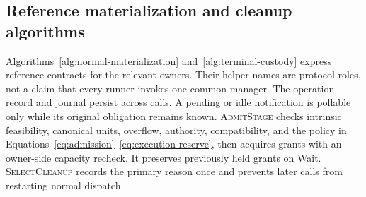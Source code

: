 \subsection{Reference materialization and cleanup algorithms}
\label{sec:algorithms}
Algorithms~\ref{alg:normal-materialization} and~\ref{alg:terminal-custody}
express reference contracts for the relevant owners. Their helper names are
protocol roles, not a claim that every runner invokes one common manager.
The operation record and journal persist across calls. A pending or idle
notification is pollable only while its original obligation remains known.
\textsc{AdmitStage} checks intrinsic feasibility, canonical units, overflow,
authority, compatibility, and the policy in
Equations~\ref{eq:admission}--\ref{eq:execution-reserve}, then acquires grants
with an owner-side capacity recheck. It preserves previously held grants on
\textsf{Wait}. \textsc{SelectCleanup} records the primary reason once and
prevents later calls from restarting normal dispatch.

